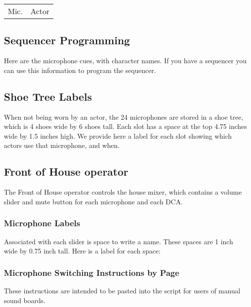 \documentclass[letterpaper]{article}
\begin{document}
\begin{center}
\begin{longtable}{|l|l|}
\hline Mic. & Actor \endhead \hline

\end{longtable}
\end{center}

\subsection {Sequencer Programming}

Here are the microphone cues, with character names.  If you
have a sequencer you can use this information to program
the sequencer.



\subsection {Shoe Tree Labels}

When not being worn by an actor, the 24 microphones are stored in a shoe tree,
which is 4 shoes wide by 6 shoes tall.  
Each slot has a space at the top 4.75 inches wide
by 1.5 inches high.  We provide here a label for each slot showing which
actors use that microphone, and when.

{\Large

}

\subsection {Front of House operator}

The Front of House operator controls the house mixer, 
which contains a volume slider
and mute button for each microphone and each DCA.

\subsubsection {Microphone Labels}

Associated with each slider is space to write a name.  
These spaces are 1 inch wide by 0.75 inch tall.  
Here is a label for each space:

{\Large

}

\subsubsection {Microphone Switching Instructions by Page}

These instructions are intended to be pasted into the script for users
of manual sound boards.


\end{document}
